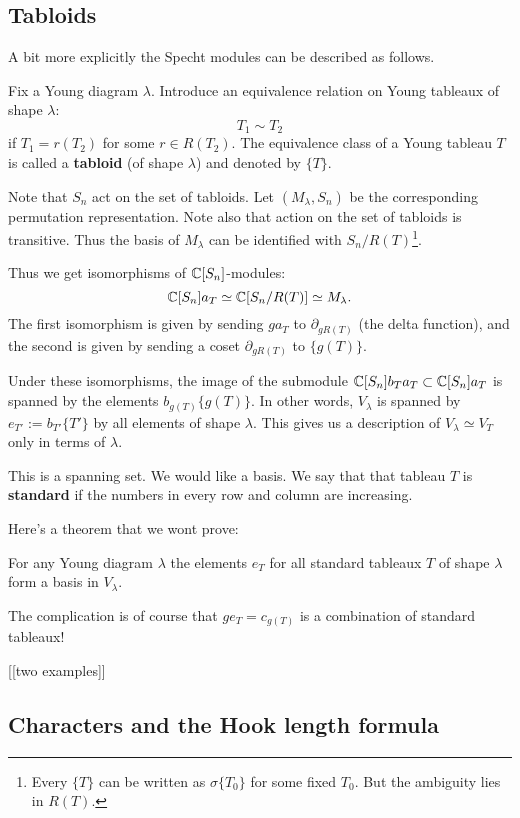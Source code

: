 \documentclass[11pt, english]{article}
\begin{document}
\subsection{Tabloids}

A bit more explicitly the Specht modules can be described as follows.

Fix a Young diagram $\lambda$. Introduce an equivalence relation on Young tableaux of shape $\lambda$:
$$
T_1 \sim T_2 
$$
if $T_1 = r(T_2)$ for some $r \in R(T_2)$. The equivalence class of a Young tableau $T$ is called a \textbf{tabloid} (of shape $\lambda$) and denoted by $\{ T \}$. 

Note that $S_n$ act on the set of tabloids. Let $(M_\lambda,S_n)$ be the corresponding permutation representation. Note also that action on the set of tabloids is transitive. Thus the basis of $M_\lambda$ can be identified with $S_n/R(T)$\footnote{Every $\{T \}$ can be written as $\sigma \{ T_0\}$ for some fixed $T_0$. But the ambiguity lies in $R(T)$.}.  

Thus we get isomorphisms of $\mathbb{C}[S_n]$-modules:
$$
\mathbb{C}[S_n]a_T \simeq \mathbb{C}[S_n/R(T)] \simeq M_\lambda.
$$
The first isomorphism is given by sending $ga_T$ to $\partial_{gR(T)}$ (the delta function), and the second is given by sending a coset $\partial_{gR(T)}$ to $\{g(T)\}$. 

Under these isomorphisms, the image of the  submodule $\mathbb{C}[S_n]b_T a_T \subset \mathbb{C}[S_n]a_T$ is spanned by the elements $b_{g(T)} \{ g(T) \}$. In other words, $V_\lambda$ is spanned by $e_{T'} := b_{T'} \{ T' \}$ by all elements of shape $\lambda$. This gives us a description of $V_\lambda \simeq V_T$ only in terms of $\lambda$.

This is a spanning set. We would like a basis. We say that that tableau $T$ is \textbf{standard} if the numbers in every row and column are increasing.

Here's a theorem that we wont prove:
\begin{thm}
 For any Young diagram $\lambda$ the elements $e_T$ for all standard tableaux $T$ of shape $\lambda$ form a basis in $V_\lambda$.
\end{thm}

The complication is of course that $g e_T = c_{g(T)}$ is a combination of standard tableaux! 

[[two examples]]

\subsection{Characters and the Hook length formula}
\end{document}
